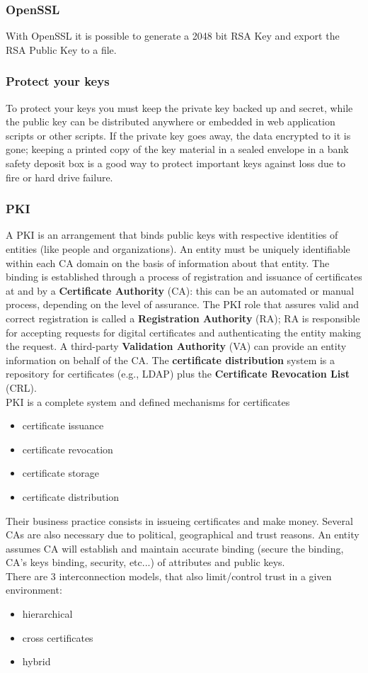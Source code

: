 \documentclass[a4paper, 10pt, titlepage]{article}
\begin{document}
\subsubsection*{OpenSSL}
With OpenSSL it is possible to generate a 2048 bit RSA Key and export the RSA Public Key to a file.

\subsubsection*{Protect your keys}
To protect your keys you must keep the private key backed up and secret, while the public key can be distributed anywhere or embedded in web application scripts or other scripts. If the private key goes away, the data encrypted to it is gone; keeping a printed copy of the key material in a sealed envelope in a bank safety deposit box is a good way to protect important keys against loss due to fire or hard drive failure.

\subsubsection{PKI}
A PKI is an arrangement that binds public keys with respective identities of entities (like people and organizations). An entity must be uniquely identifiable within each CA domain on the basis of information about that entity. The binding is established through a process of registration and issuance of certificates at and by a \textbf{Certificate Authority} (CA): this can be an automated or manual process, depending on the level of assurance.
The PKI role that assures valid and correct registration is called a \textbf{Registration Authority} (RA); RA is responsible for accepting requests for digital certificates and authenticating the entity making the request. A third-party \textbf{Validation Authority} (VA) can provide an entity information on behalf of the CA. The \textbf{certificate distribution} system is a repository for certificates (e.g., LDAP) plus the  \textbf{Certificate Revocation List} (CRL). \\
PKI is a complete system and defined mechanisms for certificates
\begin{itemize}
\item certificate issuance
\item certificate revocation
\item certificate storage
\item certificate distribution
\end{itemize}
Their business practice consists in issueing certificates and make money. Several CAs are also necessary due to political, geographical and trust reasons. An entity assumes CA will establish and maintain accurate binding (secure the binding, CA’s keys binding, security, etc...) of attributes and public keys. \\
There are 3 interconnection models, that also limit/control trust in a given environment:
\begin{itemize}
\item hierarchical
\item cross certificates
\item hybrid
\end{itemize}
\end{document}
